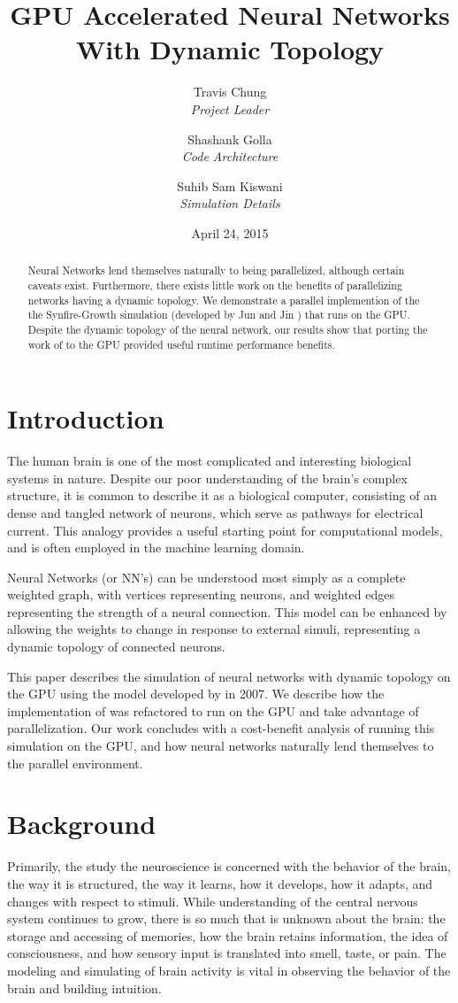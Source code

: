 \documentclass[a4paper]{article}
\title{GPU Accelerated Neural Networks With Dynamic Topology}
\author{Travis Chung\\ \emph{Project Leader}
    \and Shashank Golla\\ \emph{Code Architecture}
    \and Suhib Sam Kiswani\\\emph{Simulation Details}
}
\date{April 24, 2015}
\begin{document}
\maketitle

\begin{abstract}
Neural Networks lend themselves naturally to being parallelized, although certain caveats exist. Furthermore, there exists little work on the benefits of parallelizing networks having a dynamic topology. We demonstrate a parallel implemention of the the Synfire-Growth simulation (developed by Jun and Jin \cite{synfire}) that runs on the GPU. Despite the dynamic topology of the neural network, our results show that porting the work of \cite{synfire} to the GPU provided useful runtime performance benefits.
\end{abstract}


\section{Introduction}
The human brain is one of the most complicated and interesting biological systems in nature. Despite our poor understanding of the brain's complex structure, it is common to describe it as a biological computer, consisting of an dense and tangled network of neurons, which serve as pathways for electrical current. This analogy provides a useful starting point for computational models, and is often employed in the machine learning domain.

Neural Networks (or NN's) can be understood most simply as a complete weighted graph, with vertices representing neurons, and weighted edges representing the strength of a neural connection. This model can be enhanced by allowing the weights to change in response to external simuli, representing a dynamic topology of connected neurons.


This paper describes the simulation of neural networks with dynamic topology on the GPU using the model developed by \cite{synfire} in 2007. We describe how the implementation of \cite{synfire} was refactored to run on the GPU and take advantage of parallelization. Our work concludes with a cost-benefit analysis of running this simulation on the GPU, and how neural networks naturally lend themselves to the parallel environment.


\section{Background}
Primarily, the study the neuroscience is concerned with the behavior of the brain, the way it is structured, the way it learns, how it develops, how it adapts, and changes with respect to stimuli. While understanding of the central nervous system continues to grow, there is so much that is unknown about the brain: the storage and accessing of memories, how the brain retains information, the idea of consciousness, and how sensory input is translated into smell, taste, or pain. The modeling and simulating of brain activity is vital in observing the behavior of the brain and building intuition.
\end{document}
